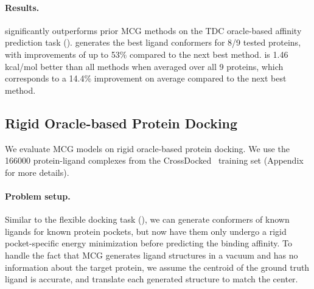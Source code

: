 \paragraph{Results.}
\model significantly outperforms prior MCG methods on the TDC oracle-based affinity prediction task ().
\model generates the best ligand conformers for 8/9 tested proteins, with improvements of up to 53\% compared to the next best method. 
\model is 1.46 kcal/mol better than all methods when averaged over all 9 proteins, which corresponds to a 14.4\% improvement on average compared to the next best method.
\subsection{Rigid Oracle-based Protein Docking}
\label{sec:rigid}
We evaluate MCG models on rigid oracle-based protein docking. We use the 166000 protein-ligand complexes from the CrossDocked~\citep{CrossDocked} training set (Appendix~ for more details).

\paragraph{Problem setup.} Similar to the flexible docking task (), we can generate conformers of known ligands for known protein pockets, but now have them only undergo a rigid pocket-specific energy minimization before predicting the binding affinity. 
To handle the fact that MCG generates ligand structures in a vacuum and has no information about the target protein, we assume the centroid of the ground truth ligand is accurate, and translate each generated structure to match the center.

